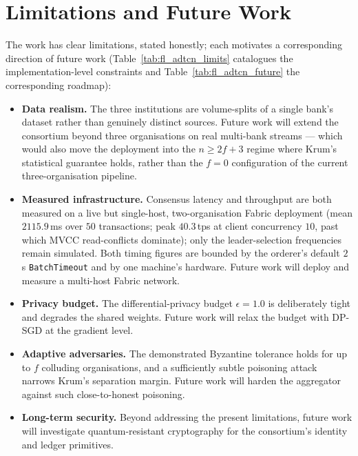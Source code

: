 \section{Limitations and Future Work}

The work has clear limitations, stated honestly; each motivates a corresponding direction of future work (Table~\ref{tab:fl_adtcn_limits} catalogues the implementation-level constraints and Table~\ref{tab:fl_adtcn_future} the corresponding roadmap):

\begin{itemize}
    \item \textbf{Data realism.} The three institutions are volume-splits of a single bank's dataset rather than genuinely distinct sources. Future work will extend the consortium beyond three organisations on real multi-bank streams --- which would also move the deployment into the $n\ge 2f+3$ regime where Krum's statistical guarantee holds, rather than the $f=0$ configuration of the current three-organisation pipeline.
    \item \textbf{Measured infrastructure.} Consensus latency and throughput are both measured on a live but single-host, two-organisation Fabric deployment (mean $2115.9$\,ms over $50$ transactions; peak $40.3$\,tps at client concurrency $10$, past which MVCC read-conflicts dominate); only the leader-selection frequencies remain simulated. Both timing figures are bounded by the orderer's default $2$\,s \texttt{BatchTimeout} and by one machine's hardware. Future work will deploy and measure a multi-host Fabric network.
    \item \textbf{Privacy budget.} The differential-privacy budget $\epsilon=1.0$ is deliberately tight and degrades the shared weights. Future work will relax the budget with DP-SGD at the gradient level.
    \item \textbf{Adaptive adversaries.} The demonstrated Byzantine tolerance holds for up to $f$ colluding organisations, and a sufficiently subtle poisoning attack narrows Krum's separation margin. Future work will harden the aggregator against such close-to-honest poisoning.
    \item \textbf{Long-term security.} Beyond addressing the present limitations, future work will investigate quantum-resistant cryptography for the consortium's identity and ledger primitives.
\end{itemize}
